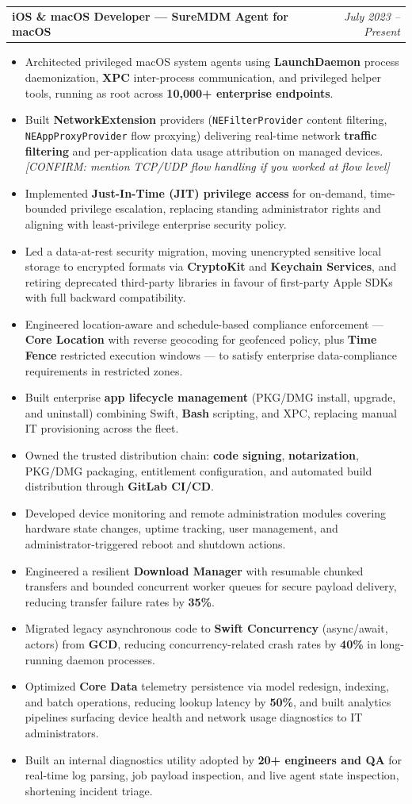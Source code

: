 \documentclass[letterpaper,11pt]{article}
\makeatletter
\newcommand{\resumeItem}[1]{\item\small{{#1 \vspace{-2pt}}}}
\newcommand{\resumeRole}[2]{
    \item
    \begin{tabular*}{0.97\textwidth}{l@{\extracolsep{\fill}}r}
      \textbf{\small#1} & \textit{\small #2} \\
    \end{tabular*}\vspace{-7pt}
}
\newcommand{\resumeItemListStart}{\begin{itemize}}
\newcommand{\resumeItemListEnd}{\end{itemize}\vspace{-5pt}}
\makeatother
\begin{document}
        \resumeRole{iOS \& macOS Developer — SureMDM Agent for macOS}{July 2023 -- Present}
            \resumeItemListStart
                \resumeItem{Architected privileged macOS system agents using \textbf{LaunchDaemon} process daemonization, \textbf{XPC} inter-process communication, and privileged helper tools, running as root across \textbf{10,000+ enterprise endpoints}.}
                \resumeItem{Built \textbf{NetworkExtension} providers (\texttt{NEFilterProvider} content filtering, \texttt{NEAppProxyProvider} flow proxying) delivering real-time network \textbf{traffic filtering} and per-application data usage attribution on managed devices. \textit{[CONFIRM: mention TCP/UDP flow handling if you worked at flow level]}}
                \resumeItem{Implemented \textbf{Just-In-Time (JIT) privilege access} for on-demand, time-bounded privilege escalation, replacing standing administrator rights and aligning with least-privilege enterprise security policy.}
                \resumeItem{Led a data-at-rest security migration, moving unencrypted sensitive local storage to encrypted formats via \textbf{CryptoKit} and \textbf{Keychain Services}, and retiring deprecated third-party libraries in favour of first-party Apple SDKs with full backward compatibility.}
                \resumeItem{Engineered location-aware and schedule-based compliance enforcement — \textbf{Core Location} with reverse geocoding for geofenced policy, plus \textbf{Time Fence} restricted execution windows — to satisfy enterprise data-compliance requirements in restricted zones.}
                \resumeItem{Built enterprise \textbf{app lifecycle management} (PKG/DMG install, upgrade, and uninstall) combining Swift, \textbf{Bash} scripting, and XPC, replacing manual IT provisioning across the fleet.}
                \resumeItem{Owned the trusted distribution chain: \textbf{code signing}, \textbf{notarization}, PKG/DMG packaging, entitlement configuration, and automated build distribution through \textbf{GitLab CI/CD}.}
                \resumeItem{Developed device monitoring and remote administration modules covering hardware state changes, uptime tracking, user management, and administrator-triggered reboot and shutdown actions.}
                \resumeItem{Engineered a resilient \textbf{Download Manager} with resumable chunked transfers and bounded concurrent worker queues for secure payload delivery, reducing transfer failure rates by \textbf{35\%}.}
                \resumeItem{Migrated legacy asynchronous code to \textbf{Swift Concurrency} (async/await, actors) from \textbf{GCD}, reducing concurrency-related crash rates by \textbf{40\%} in long-running daemon processes.}
                \resumeItem{Optimized \textbf{Core Data} telemetry persistence via model redesign, indexing, and batch operations, reducing lookup latency by \textbf{50\%}, and built analytics pipelines surfacing device health and network usage diagnostics to IT administrators.}
                \resumeItem{Built an internal diagnostics utility adopted by \textbf{20+ engineers and QA} for real-time log parsing, job payload inspection, and live agent state inspection, shortening incident triage.}
            \resumeItemListEnd
\end{document}
